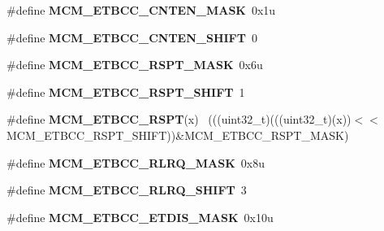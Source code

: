 \begin{DoxyCompactItemize}
\item 
\hypertarget{group___m_c_m___register___masks_gaaffa6b23f821bd7647db6b0abcaf504a}{}\#define {\bfseries M\+C\+M\+\_\+\+E\+T\+B\+C\+C\+\_\+\+C\+N\+T\+E\+N\+\_\+\+M\+A\+S\+K}~0x1u\label{group___m_c_m___register___masks_gaaffa6b23f821bd7647db6b0abcaf504a}

\item 
\hypertarget{group___m_c_m___register___masks_ga8262666b7fec7b20ea3e871bdb325dc1}{}\#define {\bfseries M\+C\+M\+\_\+\+E\+T\+B\+C\+C\+\_\+\+C\+N\+T\+E\+N\+\_\+\+S\+H\+I\+F\+T}~0\label{group___m_c_m___register___masks_ga8262666b7fec7b20ea3e871bdb325dc1}

\item 
\hypertarget{group___m_c_m___register___masks_ga155cfa2bfc46e64c665a8aeed061da6f}{}\#define {\bfseries M\+C\+M\+\_\+\+E\+T\+B\+C\+C\+\_\+\+R\+S\+P\+T\+\_\+\+M\+A\+S\+K}~0x6u\label{group___m_c_m___register___masks_ga155cfa2bfc46e64c665a8aeed061da6f}

\item 
\hypertarget{group___m_c_m___register___masks_ga7e85c0a405fa8e736ea6b11e2a2ce2cf}{}\#define {\bfseries M\+C\+M\+\_\+\+E\+T\+B\+C\+C\+\_\+\+R\+S\+P\+T\+\_\+\+S\+H\+I\+F\+T}~1\label{group___m_c_m___register___masks_ga7e85c0a405fa8e736ea6b11e2a2ce2cf}

\item 
\hypertarget{group___m_c_m___register___masks_ga662ac6f34a5c06e2209edeb7f4ec3fd3}{}\#define {\bfseries M\+C\+M\+\_\+\+E\+T\+B\+C\+C\+\_\+\+R\+S\+P\+T}(x)                                            ~(((uint32\+\_\+t)(((uint32\+\_\+t)(x))$<$$<$M\+C\+M\+\_\+\+E\+T\+B\+C\+C\+\_\+\+R\+S\+P\+T\+\_\+\+S\+H\+I\+F\+T))\&M\+C\+M\+\_\+\+E\+T\+B\+C\+C\+\_\+\+R\+S\+P\+T\+\_\+\+M\+A\+S\+K)\label{group___m_c_m___register___masks_ga662ac6f34a5c06e2209edeb7f4ec3fd3}

\item 
\hypertarget{group___m_c_m___register___masks_ga16853921aa4b5ded12e5bf4d2c8509fb}{}\#define {\bfseries M\+C\+M\+\_\+\+E\+T\+B\+C\+C\+\_\+\+R\+L\+R\+Q\+\_\+\+M\+A\+S\+K}~0x8u\label{group___m_c_m___register___masks_ga16853921aa4b5ded12e5bf4d2c8509fb}

\item 
\hypertarget{group___m_c_m___register___masks_ga9ea97398989700f275f186a44b5d86b7}{}\#define {\bfseries M\+C\+M\+\_\+\+E\+T\+B\+C\+C\+\_\+\+R\+L\+R\+Q\+\_\+\+S\+H\+I\+F\+T}~3\label{group___m_c_m___register___masks_ga9ea97398989700f275f186a44b5d86b7}

\item 
\hypertarget{group___m_c_m___register___masks_ga4e65e76bc2ffbd1a4577fb31da7e5fbb}{}\#define {\bfseries M\+C\+M\+\_\+\+E\+T\+B\+C\+C\+\_\+\+E\+T\+D\+I\+S\+\_\+\+M\+A\+S\+K}~0x10u\label{group___m_c_m___register___masks_ga4e65e76bc2ffbd1a4577fb31da7e5fbb}


\end{DoxyCompactItemize}
